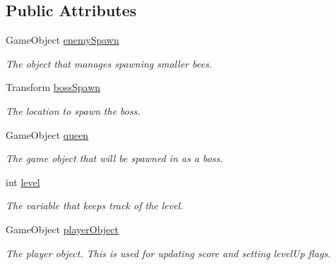 \subsection*{Public Attributes}
\begin{DoxyCompactItemize}
\item 
\mbox{\label{class_level_controller_aa449cd525fbc71a079d640241e6ecff3}} 
Game\+Object \mbox{\hyperlink{class_level_controller_aa449cd525fbc71a079d640241e6ecff3}{enemy\+Spawn}}
\begin{DoxyCompactList}\small\item\em The object that manages spawning smaller bees. \end{DoxyCompactList}\item 
\mbox{\label{class_level_controller_a986d38f2ec210fe0bd48aae961ebb1a7}} 
Transform \mbox{\hyperlink{class_level_controller_a986d38f2ec210fe0bd48aae961ebb1a7}{boss\+Spawn}}
\begin{DoxyCompactList}\small\item\em The location to spawn the boss. \end{DoxyCompactList}\item 
\mbox{\label{class_level_controller_a42fdf92db6ac8eb813e54501476bdc21}} 
Game\+Object \mbox{\hyperlink{class_level_controller_a42fdf92db6ac8eb813e54501476bdc21}{queen}}
\begin{DoxyCompactList}\small\item\em The game object that will be spawned in as a boss. \end{DoxyCompactList}\item 
\mbox{\label{class_level_controller_ab3159878c28f1cf902172794006316d2}} 
int \mbox{\hyperlink{class_level_controller_ab3159878c28f1cf902172794006316d2}{level}}
\begin{DoxyCompactList}\small\item\em The variable that keeps track of the level. \end{DoxyCompactList}\item 
\mbox{\label{class_level_controller_a1999776383f5764862b235ee28106434}} 
Game\+Object \mbox{\hyperlink{class_level_controller_a1999776383f5764862b235ee28106434}{player\+Object}}
\begin{DoxyCompactList}\small\item\em The player object. This is used for updating score and setting level\+Up flags. \end{DoxyCompactList}\item 

\end{DoxyCompactItemize}
